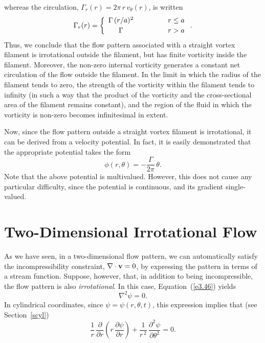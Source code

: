 whereas the circulation, $\Gamma_r(r) = 2\pi\,r\,v_\theta(r)$, is written
\begin{eqnarray}
\Gamma_r(r)= \left\{\begin{array}{ccc}
\Gamma\,(r/a)^2&\mbox{\hspace{1cm}}&r\leq a\\[0.5ex]
\Gamma&&r>a
\end{array}\right..
\end{eqnarray}
Thus, we conclude that the flow pattern associated with a straight vortex filament is irrotational
outside the filament, but has finite vorticity inside the filament. Moreover, the  non-zero internal
vorticity generates a constant net circulation of the flow outside the filament. In the limit in which the
radius of the filament tends to zero, the strength of the vorticity within the filament tends to infinity
(in such a way that the product of the vorticity and the cross-sectional area of the filament remains
constant), and the region of the fluid in which the vorticity is non-zero becomes infinitesimal in extent. 

Now, since the flow pattern outside a straight vortex filament is irrotational, it can be derived from a velocity potential. 
In fact, it is easily demonstrated that the appropriate potential takes the form 
\begin{equation}
\phi(r,\theta)= - \frac{\Gamma}{2\pi}\,\theta.
\end{equation}
Note that the above potential is multivalued. However, this does not cause any
particular difficulty,
since the potential is continuous, and its gradient single-valued. 

\section{Two-Dimensional Irrotational Flow}
As we have seen,  in a two-dimensional flow pattern, we can automatically satisfy the
incompressibility constraint, $\nabla\cdot{\bf v}=0$,  by expressing the pattern in terms of a stream function. Suppose, however, that, in addition
to being incompressible, the flow pattern is also {\em irrotational}. In this case,
Equation~(\ref{e3.46}) yields
\begin{equation}
\nabla^2\psi=0.
\end{equation}
In cylindrical coordinates, since $\psi=\psi(r,\theta,t)$, this expression implies that (see Section~\ref{scyl})
\begin{equation}
\frac{1}{r}\,\frac{\partial}{\partial r}\!\left(r\,\frac{\partial\psi}{\partial r}\right) + \frac{1}{r^{\,2}}\,\frac{\partial^2\psi}{\partial\theta^2}
=0.\label{e3.53}
\end{equation}

